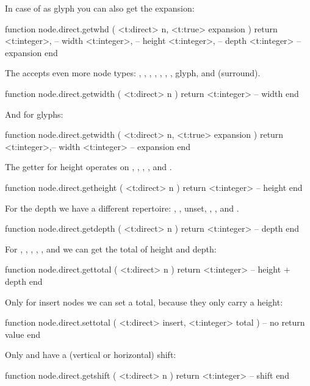 In case of as glyph you can also get the expansion:

\starttyping[option=LUA]
function node.direct.getwhd ( <t:direct> n, <t:true> expansion )
    return
        <t:integer>, -- width
        <t:integer>, -- height
        <t:integer>, -- depth
        <t:integer>  -- expansion
end
\stoptyping

The  accepts even more node types: , ,
, , , , , \type
{glyph},  and  (surround).

\starttyping[option=LUA]
function node.direct.getwidth ( <t:direct> n )
    return <t:integer> -- width
end
\stoptyping

And for glyphs:

\starttyping[option=LUA]
function node.direct.getwidth ( <t:direct> n, <t:true> expansion )
    return
        <t:integer>,-- width
        <t:integer> -- expansion
end
\stoptyping

The getter for height operates on , , ,
,  and .

\starttyping[option=LUA]
function node.direct.getheight ( <t:direct> n )
    return <t:integer> -- height
end
\stoptyping

For the depth we have a different repertoire: , , \type
{unset}, , ,  and .

\starttyping[option=LUA]
function node.direct.getdepth ( <t:direct> n )
    return <t:integer> -- depth
end
\stoptyping

For , , , , ,
 and  we can get the total of height and depth:

\starttyping[option=LUA]
function node.direct.gettotal ( <t:direct> n )
    return <t:integer> -- height + depth
end
\stoptyping

Only for insert nodes we can set a total, because they only carry a height:

\starttyping[option=LUA]
function node.direct.settotal (
    <t:direct>  insert,
    <t:integer> total
)
    -- no return value
end
\stoptyping

Only  and  have a (vertical or horizontal) shift:

\starttyping[option=LUA]
function node.direct.getshift ( <t:direct> n )
    return <t:integer> -- shift
end
\stoptyping

